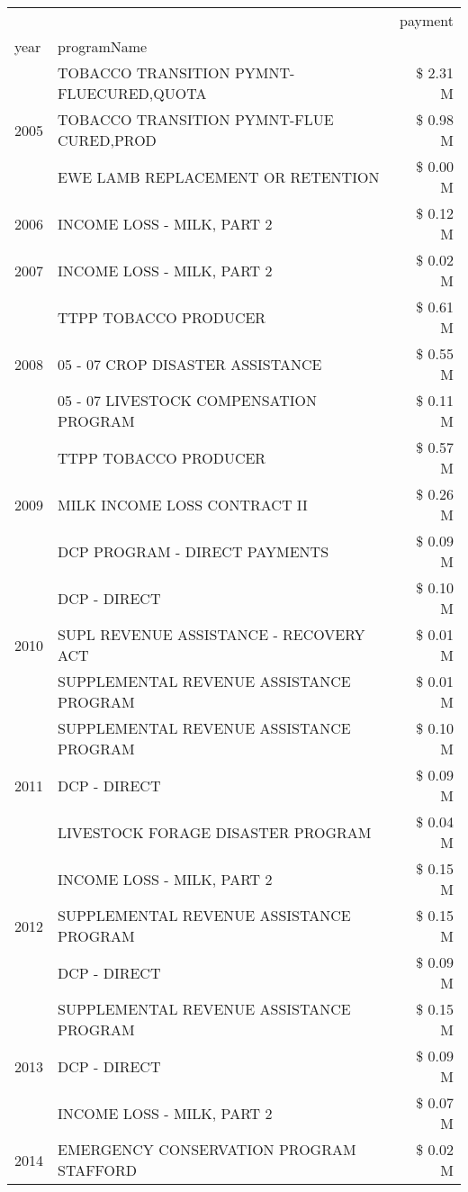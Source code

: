 \begin{tabular}{llr}
\toprule
 &  & payment \\
year & programName &  \\
\midrule
\multirow[t]{3}{*}{2005} & TOBACCO TRANSITION PYMNT-FLUECURED,QUOTA & \$ 2.31 M \\
 & TOBACCO TRANSITION PYMNT-FLUE CURED,PROD & \$ 0.98 M \\
 & EWE LAMB REPLACEMENT OR RETENTION & \$ 0.00 M \\
\cline{1-3}
2006 & INCOME LOSS - MILK, PART 2 & \$ 0.12 M \\
\cline{1-3}
2007 & INCOME LOSS - MILK, PART 2 & \$ 0.02 M \\
\cline{1-3}
\multirow[t]{3}{*}{2008} & TTPP TOBACCO PRODUCER & \$ 0.61 M \\
 & 05 - 07 CROP DISASTER ASSISTANCE & \$ 0.55 M \\
 & 05 - 07 LIVESTOCK COMPENSATION PROGRAM & \$ 0.11 M \\
\cline{1-3}
\multirow[t]{3}{*}{2009} & TTPP TOBACCO PRODUCER & \$ 0.57 M \\
 & MILK INCOME LOSS CONTRACT II & \$ 0.26 M \\
 & DCP PROGRAM - DIRECT PAYMENTS & \$ 0.09 M \\
\cline{1-3}
\multirow[t]{3}{*}{2010} & DCP - DIRECT & \$ 0.10 M \\
 & SUPL REVENUE ASSISTANCE - RECOVERY ACT & \$ 0.01 M \\
 & SUPPLEMENTAL REVENUE ASSISTANCE PROGRAM & \$ 0.01 M \\
\cline{1-3}
\multirow[t]{3}{*}{2011} & SUPPLEMENTAL REVENUE ASSISTANCE PROGRAM & \$ 0.10 M \\
 & DCP - DIRECT & \$ 0.09 M \\
 & LIVESTOCK FORAGE DISASTER PROGRAM & \$ 0.04 M \\
\cline{1-3}
\multirow[t]{3}{*}{2012} & INCOME LOSS - MILK, PART 2 & \$ 0.15 M \\
 & SUPPLEMENTAL REVENUE ASSISTANCE PROGRAM & \$ 0.15 M \\
 & DCP - DIRECT & \$ 0.09 M \\
\cline{1-3}
\multirow[t]{3}{*}{2013} & SUPPLEMENTAL REVENUE ASSISTANCE PROGRAM & \$ 0.15 M \\
 & DCP - DIRECT & \$ 0.09 M \\
 & INCOME LOSS - MILK, PART 2 & \$ 0.07 M \\
\cline{1-3}
\multirow[t]{3}{*}{2014} & EMERGENCY CONSERVATION PROGRAM STAFFORD & \$ 0.02 M \\

\end{tabular}
